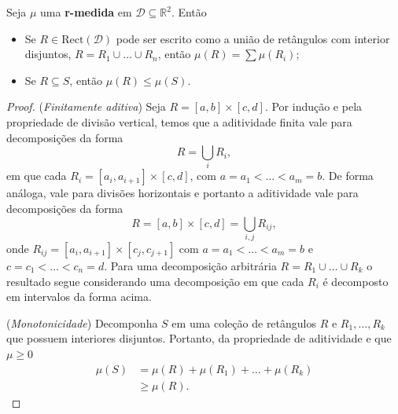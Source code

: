 \begin{propo}
    Seja $\mu$ uma \textbf{r-medida} em $\mathcal{D} \subseteq \mathbb{R}^2$. Então 
    \begin{itemize}
        \item Se $R \in \text{Rect}(\mathcal{D})$ pode ser escrito como a união de retângulos com interior
        disjuntos, $R = R_1 \cup \dots \cup R_n$, então $\mu(R) = \sum \mu(R_i)$;
        \item Se $R \subseteq S$, então $\mu(R) \leq \mu(S)$.
    \end{itemize}    
\end{propo}
\begin{proof}
    (\textit{Finitamente aditiva}) Seja $R = [a,b] \times [c,d]$. Por indução e pela propriedade de divisão
    vertical, temos que a aditividade finita vale para decomposições da forma 
    \begin{equation*}
        R = \bigcup_i R_i,
    \end{equation*}
    em que cada $R_i = [a_i, a_{i+1}] \times [c,d]$, com $a = a_1 < \dots < a_m = b$. De forma análoga,
    vale para divisões horizontais e portanto a aditividade vale para decomposições da forma
    \begin{equation*}
        R = [a,b] \times [c,d] = \bigcup_{i,j} R_{ij},
    \end{equation*}
    onde $R_{ij} = [a_i, a_{i+1}] \times [c_j, c_{j+1}]$ com $a = a_1 < \dots < a_m = b$ e $c = c_1 < 
    \dots < c_n = d$. Para uma decomposição arbitrária $R = R_1 \cup \dots \cup R_k$ o resultado segue
    considerando uma decomposição em que cada $R_i$ é decomposto em intervalos da forma acima.  

    (\textit{Monotonicidade}) Decomponha $S$ em uma coleção de retângulos $R$ e $R_1, \dots, R_k$ que 
    possuem interiores disjuntos. Portanto, da propriedade de aditividade e que $\mu \geq 0$
    \begin{align*}
        \mu(S) & = \mu(R) + \mu(R_1) + \dots + \mu(R_k) \\
               & \geq \mu(R).
    \end{align*}
\end{proof}

